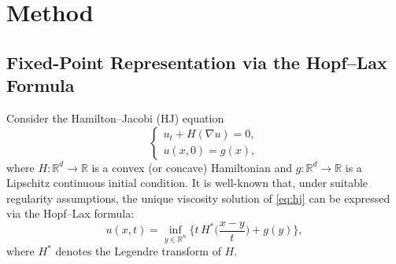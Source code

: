 \documentclass[review,hidelinks,onefignum,onetabnum]{siamart250106}
\begin{document}




\section{Method}
\subsection{Fixed-Point Representation via the Hopf--Lax Formula}
Consider the Hamilton--Jacobi (HJ) equation
\begin{equation}\label{eq:hj}
\begin{cases}
    u_t + H(\nabla u) = 0,\\
    u( x ,0) = g( x ),
\end{cases}
\end{equation}
where \(H:\mathbb{R}^d\rightarrow\mathbb{R}\) is a convex (or concave) Hamiltonian and \(g:\mathbb{R}^d\rightarrow\mathbb{R}\) is a Lipschitz continuous initial condition. It is well-known that, under suitable regularity assumptions, the unique viscosity solution of \eqref{eq:hj} can be expressed via the Hopf--Lax formula:
\begin{equation}\label{eq:hopf_lax}
    u(x,t) = \inf_{y \in \mathbb{R}^n} \Big\{ t\,H^\ast\Big(\frac{x-y}{t}\Big) + g(y) \Big\},
\end{equation}
where \(H^\ast\) denotes the Legendre transform of \(H\).  
\end{document}
